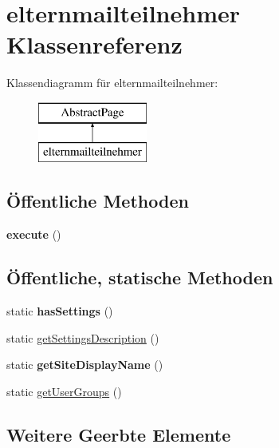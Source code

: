 \hypertarget{classelternmailteilnehmer}{}\section{elternmailteilnehmer Klassenreferenz}
\label{classelternmailteilnehmer}
Klassendiagramm für elternmailteilnehmer\+:\begin{figure}[H]
\begin{center}
\leavevmode
\includegraphics[height=2.000000cm]{classelternmailteilnehmer}
\end{center}
\end{figure}
\subsection*{Öffentliche Methoden}
\begin{DoxyCompactItemize}
\item 
\mbox{\label{classelternmailteilnehmer_af189ca937caf6fd33824a169db9ec886}} 
{\bfseries execute} ()
\end{DoxyCompactItemize}
\subsection*{Öffentliche, statische Methoden}
\begin{DoxyCompactItemize}
\item 
\mbox{\label{classelternmailteilnehmer_a1d8cff9e1ba035a2c11ab48aff7e9664}} 
static {\bfseries has\+Settings} ()
\item 
static \mbox{\hyperlink{classelternmailteilnehmer_a01251c82b8dc0f5f53890ab778b5e65f}{get\+Settings\+Description}} ()
\item 
\mbox{\label{classelternmailteilnehmer_ab55ead27ea3d83d7e56629aa1045004e}} 
static {\bfseries get\+Site\+Display\+Name} ()
\item 
static \mbox{\hyperlink{classelternmailteilnehmer_a4da8930163b44e21e624888c9c9d14b5}{get\+User\+Groups}} ()
\end{DoxyCompactItemize}
\subsection*{Weitere Geerbte Elemente}


